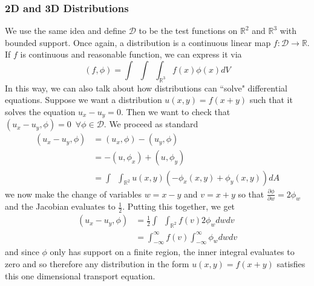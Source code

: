 \documentclass{article}
\newcommand{\R}{\mathbb{R}}
\newcommand{\pd}[2]{\frac{\partial #1}{\partial #2}}
\newcommand{\push}{\,\,\,}
\theoremstyle{definition}
\begin{document}
\subsubsection{2D and 3D Distributions}
We use the same idea and define $\mathcal{D}$ to be the test functions on $\R^2$ and $\R^3$ with bounded support. Once again, a distribution is a continuous linear map $f:\mathcal{D} \to \R$. If $f$ is continuous and reasonable function, we can express it via 
\begin{equation*}
    (f,\phi) = \int \push \int \push \int_{\R^3} f(x) \phi (x) dV
\end{equation*}
In this way, we can also talk about how distributions can ``solve" differential equations. Suppose we want a distribution $u(x,y)=f(x+y)$ such that it solves the equation $u_x-u_y=0$. Then we want to check that $(u_x-u_y,\phi) = 0 \push \forall \phi \in \mathcal{D}$. We proceed as standard 
\begin{equation*}
    \begin{split}
        (u_x-u_y,\phi) &= (u_x,\phi)-(u_y,\phi) \\
        &= -(u,\phi_x) + (u,\phi_y) \\
        &= \int\push\int_{\R^2} u(x,y)(-\phi_x (x,y)+\phi_y(x,y))dA
    \end{split}
\end{equation*}
we now make the change of variables $w=x-y $ and $v= x+y$ so that $\pd{\phi}{w} = 2\phi_w$ and the Jacobian evaluates to $\frac{1}{2}$. Putting this together, we get 
\begin{equation*}
    \begin{split}
        (u_x-u_y,\phi) &= \frac{1}{2}\int \push \int_{\R^2} f(v) 2\phi_w dw dv \\
        &= \int^\infty_{-\infty} f(v) \int^\infty_{-\infty} \phi_w dw dv 
    \end{split}
\end{equation*}
and since $\phi$ only has support on a finite region, the inner integral evaluates to zero and so therefore any distribution in the form $u(x,y) = f(x+y)$ satisfies this one dimensional transport equation.
\end{document}
